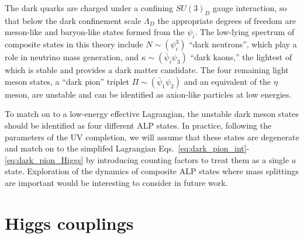 The dark quarks are charged under a confining $SU(3)_D$ gauge interaction, so that below the dark confinement scale $\Lambda_D$ the appropriate degrees of freedom are meson-like and baryon-like states formed from the $\psi_i$.  The low-lying spectrum of composite states in this theory include $N \sim (\psi_i^3)$ ``dark neutrons'', which play a role in neutrino mass generation, and $\kappa \sim (\bar{\psi}_i \psi_3)$ ``dark kaons,'' the lightest of which is stable and provides a dark matter candidate.  The four remaining light meson states,   a ``dark pion'' triplet $\Pi \sim (\bar{\psi}_1 \psi_2)$ and an equivalent of the $\eta$ meson, are unstable and can be identified as axion-like particles at low energies.

To match on to a low-energy effective Lagrangian, the unstable dark meson states should be identified as four different ALP states.  In practice, following the parameters of the UV completion, we will assume that these states are degenerate and match on to the simplifed Lagrangian  Eqs.~\ref{eq:dark_pion_int}-\ref{eq:dark_pion_Higgs} by introducing counting factors to treat them as a single $a$ state.  Exploration of the dynamics of composite ALP states where mass splittings are important would be interesting to consider in future work.

\section{Higgs couplings}

